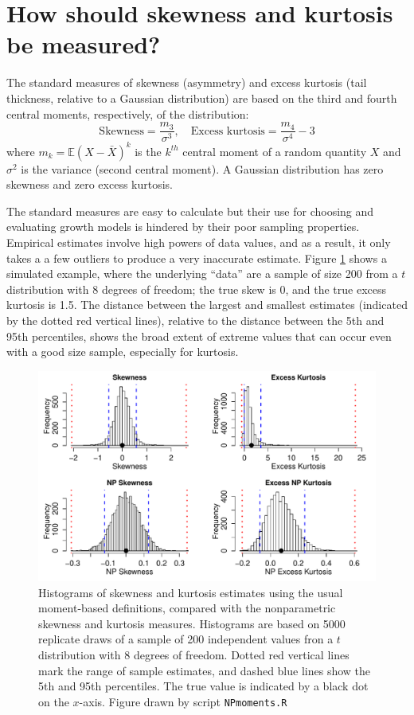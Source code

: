 \documentclass[11pt]{article}
\newcounter{box}
\newcommand{\be}{\begin{equation}}
\newcommand{\ee}{\end{equation}}
\begin{document}
{\section{How should skewness and kurtosis be measured?}
The standard measures of skewness (asymmetry) and excess kurtosis (tail thickness, relative 
to a Gaussian distribution) are based on the third and fourth central moments, respectively, of the distribution: 
\be
\mbox{Skewness} = \frac{m_3}{\sigma^3}, \quad \mbox{Excess kurtosis} = \frac{m_4}{\sigma^4}-3
\ee
where $m_k = \mathbb{E}(X - \bar{X})^k$ is the $k^{th}$ central moment of a random quantity $X$ 
and $\sigma^2$ is the variance (second central moment). A Gaussian distribution has zero skewness 
and zero excess kurtosis. 

The standard measures are easy to calculate but their use for choosing and evaluating growth models is hindered by their
poor sampling properties. Empirical estimates involve high powers of data values, and as a result, it only takes a 
a few outliers to produce a very inaccurate estimate. Figure \ref{fig:NPmoments} shows a simulated example, where the
underlying ``data'' are a sample of size 200 from a $t$ distribution with 8 degrees of freedom; the true skew is 0, and the 
true excess kurtosis is 1.5. The distance between the largest and smallest estimates (indicated by the dotted red
vertical lines), relative to the distance between the 5th and 95th percentiles, shows the broad extent of 
extreme values that can occur even with a good size sample, especially for kurtosis. 

\begin{figure}[tbp]
\centering
\includegraphics[width=\textwidth]{figures/NPmoments.pdf}
\caption{Histograms of skewness and kurtosis estimates using the usual moment-based definitions, compared with the nonparametric
skewness and kurtosis measures. Histograms are based on 5000 replicate draws of a sample of 200 independent values fron 
a $t$ distribution with 8 degrees of freedom. Dotted red vertical lines mark the range of sample estimates, 
and dashed blue lines show the 5th and 95th percentiles. The true value is indicated by a black dot on the $x$-axis.
Figure drawn by script \texttt{NPmoments.R}}
\label{fig:NPmoments}
\end{figure} 

}
\end{document}
